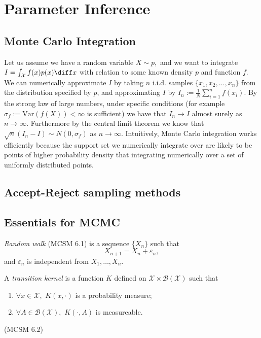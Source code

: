 \chapter{Parameter Inference}

\color{red}
\section{Monte Carlo Integration}

Let us assume we have a random variable $X\sim p,$ and we want to integrate 
$I = \int_{\mathcal{X}} f(x)p(x)\diff x$ with relation to some known density 
$p$ and function $f$. We can numerically approximate $I$ by taking 
$n$ i.i.d. samples $\{x_1, x_2, \dots, x_n\}$ from the distribution specified 
by $p$, and approximating $I$ by $I_n:=\frac{1}{N}\sum_{i = 1}^nf(x_i).$ By 
the strong law of large numbers, under specific conditions 
(for example $\sigma_f := \mathrm{Var}(f(X))<\infty$ is sufficient) 
we have that $I_n \to I$ almost surely as $n\to\infty$. Furthermore by the 
central limit theorem we know that $\sqrt{n}(I_n - I) \sim N(0, \sigma_f)$ 
as $n\to\infty.$ Intuitively, Monte Carlo integration works efficiently 
because the support set we numerically integrate over are likely to be 
points of higher probability density that integrating numerically over a 
set of uniformly distributed points.

\color{black}
\section{Accept-Reject sampling methods}

\section{Essentials for MCMC}\label{Markov_chains}

\begin{definition}
    \emph{Random walk} (MCSM 6.1) is a sequence $\{X_n\}$ such that
    $$X_{n+1} = X_n + \varepsilon_n,$$ and $\varepsilon_n$ is independent from $X_1, \dots, X_n$.
\end{definition}

\begin{definition}
    A \emph{transition kernel} is a function $K$ defined on 
    $\mathcal{X}\times\mathcal{B}(\mathcal{X})$ such that \begin{enumerate}
        \item $\forall x\in\mathcal{X},\,\,K(x,\cdot)$ is a probability measure;
        \item $\forall A\in\mathcal{B}(\mathcal{X}),\,\, K(\cdot, A)$ is measureable.
    \end{enumerate} (MCSM 6.2)
\end{definition}

